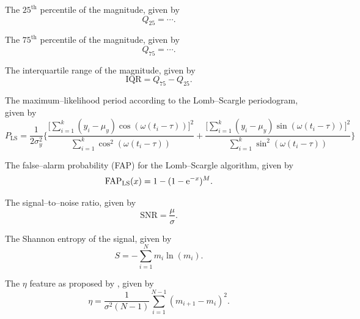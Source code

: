 \begin{enumerate}
 The $25^\text{th}$ percentile of the magnitude, given by
\begin{equation}Q_{25} = \cdots.\end{equation}

 The $75^\text{th}$ percentile of the magnitude, given by
\begin{equation}Q_{75} = \cdots.\end{equation}

 The interquartile range of the magnitude, given by
\begin{equation}\text{IQR} = Q_{75} -Q_{25}.\end{equation}

 The maximum--likelihood period according to the Lomb--Scargle periodogram, given by
\begin{equation}P_{\text{LS}} = \frac{1}{2 \sigma_y^2} \Bigg\{ \frac{\big[\sum\limits_{i=1}^k (y_i - \mu_y) \cos(\omega(t_i - \tau))\big]^2}{\sum\limits_{i=1}^k \cos^2(\omega(t_i - \tau))} + \frac{\big[\sum\limits_{i=1}^k (y_i - \mu_y) \sin(\omega(t_i - \tau))\big]^2}{\sum\limits_{i=1}^k \sin^2(\omega(t_i - \tau))}\Bigg\}\end{equation}

 The false--alarm probability (FAP) for the Lomb--Scargle algorithm, given by
\begin{equation}\text{FAP}_{\text{LS}}(x) = 1 - (1 - \mathrm{e}^{-x})^M.\end{equation}

 The signal--to--noise ratio, given by
\begin{equation}\text{SNR} = \frac{\mu}{\sigma}.\end{equation}

 The Shannon entropy \citep{shannon1949} of the signal, given by
\begin{equation}S = -\sum\limits_{i=1}^N m_i \ln(m_i).\end{equation}

 The $\eta$ feature as proposed by \citet{vonneumann1941}, given by
\begin{equation}\eta = \frac{1}{\sigma^2 (N-1)} \sum\limits_{i=1}^{N-1} (m_{i+1} - m_{i})^2.\end{equation}


\end{enumerate}
